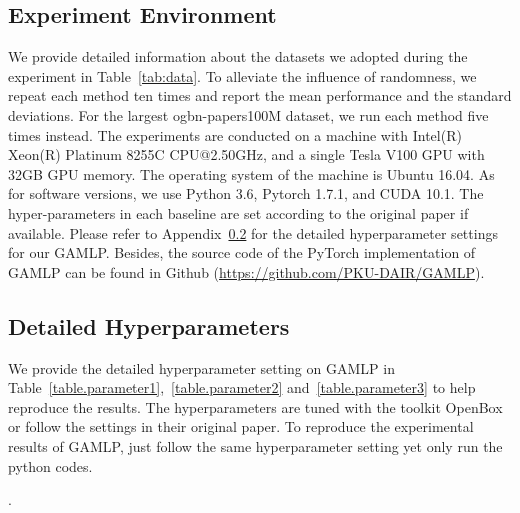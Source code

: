 \documentclass[sigconf]{acmart}
\newcommand{\sys}{\textsc{GAMLP}\xspace}
\newcommand{\blue}[1]{\textcolor{blue}{#1}}
\begin{document}
\subsection{Experiment Environment}
\label{app:dataset}
We provide detailed information about the datasets we adopted during the experiment in Table~\ref{tab:data}.
To alleviate the influence of randomness, we repeat each method ten times and report the mean performance and the standard deviations.
For the largest ogbn-papers100M dataset, we run each method five times instead.
The experiments are conducted on a machine with Intel(R) Xeon(R) Platinum 8255C CPU@2.50GHz, and a single Tesla V100 GPU with 32GB GPU memory. 
The operating system of the machine is Ubuntu 16.04. 
As for software versions, we use Python 3.6, Pytorch 1.7.1, and CUDA 10.1.
The hyper-parameters in each baseline are set according to the original paper if available. Please refer to Appendix~\ref{hyperparameters} for the detailed hyperparameter settings for our GAMLP. Besides, the source code of the PyTorch implementation of \sys can be found in Github (\blue{\url{https://github.com/PKU-DAIR/GAMLP}}). 

\subsection{Detailed Hyperparameters}
\label{hyperparameters}
We provide the detailed hyperparameter setting on GAMLP in Table~\ref{table.parameter1},~\ref{table.parameter2} and~\ref{table.parameter3} to help reproduce the results.
The hyperparameters are tuned with the toolkit OpenBox~\citep{li2021openbox} or follow the settings in their original paper.
To reproduce the experimental results of GAMLP, just follow the same hyperparameter setting yet only run the python codes.

\begin{table}[tpb!]
\centering
{
\noindent
\caption{Efficiency comparison on the ogbn-products dataset}.
\label{tab:efficiency2}
}
\label{table.effi-ogbn}
\vspace{1mm}
\end{table}
\end{document}
